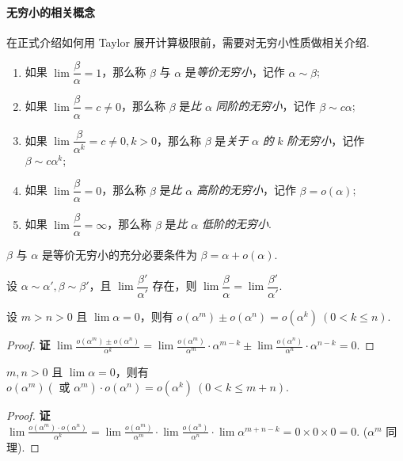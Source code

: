 \paragraph{无穷小的相关概念}
在正式介绍如何用 Taylor 展开计算极限前，需要对无穷小性质做相关介绍.
\begin{definition}[无穷小的相关定义]
    \begin{enumerate}[label=(\arabic{*})]
        \item 如果 $\lim\dfrac{\beta}{\alpha}=1$，那么称 $\beta$ 与 $\alpha$ 是\textit{等价无穷小}，记作 $\alpha\sim\beta$;
        \item 如果 $\lim\dfrac{\beta}{\alpha}=c\neq0$，那么称 $\beta$ 是\textit{比} $\alpha$ \textit{同阶的无穷小}，记作 $\beta\sim c\alpha$;
        \item 如果 $\lim\dfrac{\beta}{\alpha^k}=c\neq0,k>0$，那么称 $\beta$ 是\textit{关于} $\alpha$ \textit{的} $k$ \textit{阶无穷小}，记作 $\beta\sim c\alpha^k$;
        \item 如果 $\lim\dfrac{\beta}{\alpha}=0$，那么称 $\beta$ 是\textit{比} $\alpha$ \textit{高阶的无穷小}，记作 $\beta=o(\alpha)$;
        \item 如果 $\lim\dfrac{\beta}{\alpha}=\infty$，那么称 $\beta$ 是\textit{比} $\alpha$ \textit{低阶的无穷小}.
    \end{enumerate}
    \label{infinitesimalDefinitions}
\end{definition}

\begin{theorem}[等价无穷小的充要条件]
    $\beta$ 与 $\alpha$ 是等价无穷小的充分必要条件为 $\beta=\alpha+o(\alpha).$
\end{theorem}
\begin{theorem}[无穷小量的传递性]
    设 $\alpha\sim\alpha',\beta\sim\beta'$，且 $\lim\dfrac{\beta'}{\alpha'}$ 存在，则 $\lim\dfrac{\beta}{\alpha}=\lim\dfrac{\beta'}{\alpha'}.$
\end{theorem}
\begin{theorem}[无穷小量的加法]
    设 $m>n>0$ 且 $\lim\alpha=0$，则有 $o(\alpha^m)\pm o(\alpha^n)=o(\alpha^k)~ (0<k\leqslant n).$
\end{theorem}
\begin{proof}{\songti \textbf{证}}
    $\displaystyle\lim \frac{o\left(\alpha^{m}\right) \pm o\left(\alpha^{n}\right)}{\alpha^{k}}=\lim \frac{o\left(\alpha^{m}\right)}{\alpha^{m}} \cdot \alpha^{m-k} \pm \lim \frac{o\left(\alpha^{n}\right)}{\alpha^{n}} \cdot \alpha^{n-k}=0.$
\end{proof}
\begin{theorem}[无穷小量的乘法]
    $m,n>0$ 且 $\lim\alpha=0$，则有 $o(\alpha^m)(\text{ 或 }\alpha^m)\cdot o(\alpha^n)=o(\alpha^k)~ (0<k\leqslant m+n).$
\end{theorem}
\begin{proof}{\songti \textbf{证}}
    $\displaystyle\lim \frac{o\left(\alpha^{m}\right) \cdot o\left(\alpha^{n}\right)}{\alpha^{k}}=\lim \frac{o\left(\alpha^{m}\right)}{\alpha^{m}} \cdot \lim \frac{o\left(\alpha^{n}\right)}{\alpha^{n}} \cdot \lim \alpha^{m+n-k}=0 \times 0 \times 0=0.$ ($\alpha^m$ 同理).
\end{proof}

